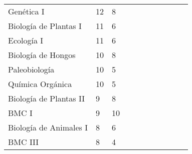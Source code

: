 \begin{table}[h!]
\begin{tabular}{l|ll|llllllll}
Genética I                   & 12       & 8                   &                     &                     &                     &                     &                     &                     &                     & \cellcolor{blue!25} \\
Biología de Plantas I        & 11       & 6                   &                     &                     &                     &                     &                     &                     &                     & \cellcolor{blue!25} \\
Ecología I                   & 11       & 6                   &                     &                     &                     &                     &                     &                     &                     & \cellcolor{blue!25} \\
Biología de Hongos           & 10       & 8                   &                     &                     &                     &                     &                     &                     &                     & \cellcolor{blue!25} \\
Paleobiología                & 10       & 5                   &                     &                     &                     &                     &                     &                     &                     & \cellcolor{blue!25} \\
Química Orgánica             & 10       & 5                   &                     &                     &                     &                     &                     &                     &                     & \cellcolor{blue!25} \\
Biología de Plantas II       & 9        & 8                   &                     &                     &                     &                     &                     &                     &                     & \cellcolor{blue!25} \\
BMC I                        & 9        & 10                  &                     &                     &                     &                     &                     &                     &                     & \cellcolor{blue!25} \\
Biología de Animales I       & 8        & 6                   &                     &                     &                     &                     &                     &                     &                     & \cellcolor{blue!25} \\
BMC III                      & 8        & 4                   &                     &                     &                     &                     &                     &                     &                     & \cellcolor{blue!25} \\

\end{tabular}
\end{table}
